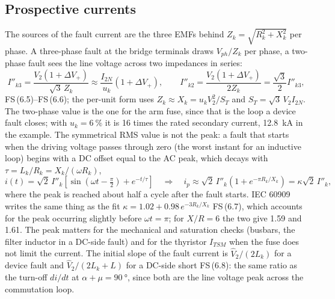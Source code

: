 \documentclass[10pt,a4paper]{scrartcl}
\newcommand{\Vll}{V_{2}}
\newcommand{\Xk}{X_{k}}
\newcommand{\Lk}{L_{k}}
\newcommand{\Rk}{R_{k}}
\newcommand{\uk}{u_{k}}
\newcommand{\ITSM}{I_{TSM}}
\newcommand{\fs}[1]{\textsf{FS}\,(#1)}
\begin{document}
\subsection{Prospective currents}
The sources of the fault current are the three EMFs behind $Z_k = \sqrt{\Rk^2+\Xk^2}$ per phase. A three-phase fault at the bridge terminals draws $V_{ph}/Z_k$ per phase, a two-phase fault sees the line voltage across two impedances in series:
\begin{equation}
I''_{k3} = \frac{\Vll(1+\Delta V_+)}{\sqrt3\,Z_k} \approx \frac{I_{2N}}{\uk}(1+\Delta V_+), \qquad
I''_{k2} = \frac{\Vll(1+\Delta V_+)}{2Z_k} = \frac{\sqrt3}{2}I''_{k3} ,
\label{eq:Ikderiv}
\end{equation}
\fs{6.5}--\fs{6.6}; the per-unit form uses $Z_k\approx\Xk = \uk\Vll^2/S_T$ and $S_T = \sqrt3\,\Vll I_{2N}$. The two-phase value is the one for the arm fuse, since that is the loop a device fault closes; with $\uk = \SI{6}{\percent}$ it is 16 times the rated secondary current, \SI{12.8}{kA} in the example. The symmetrical RMS value is not the peak: a fault that starts when the driving voltage passes through zero (the worst instant for an inductive loop) begins with a DC offset equal to the AC peak, which decays with $\tau = \Lk/\Rk = \Xk/(\omega\Rk)$,
\begin{equation}
i(t) = \sqrt2\,I''_k\left[\sin(\omega t - \tfrac{\pi}{2}) + e^{-t/\tau}\right]
\quad\Rightarrow\quad
i_p \approx \sqrt2\,I''_k\left(1 + e^{-\pi\Rk/\Xk}\right) = \kappa\sqrt2\,I''_k ,
\label{eq:kappaderiv}
\end{equation}
where the peak is reached about half a cycle after the fault starts. IEC 60909 \cite{iec60909} writes the same thing as the fit $\kappa = 1.02 + 0.98\,e^{-3\Rk/\Xk}$ \fs{6.7}, which accounts for the peak occurring slightly before $\omega t = \pi$; for $X/R = 6$ the two give 1.59 and 1.61. The peak matters for the mechanical and saturation checks (busbars, the filter inductor in a DC-side fault) and for the thyristor $\ITSM$ when the fuse does not limit the current. The initial slope of the fault current is $\hat V_2/(2\Lk)$ for a device fault and $\hat V_2/(2\Lk+L)$ for a DC-side short \fs{6.8}: the same ratio as the turn-off $di/dt$ at $\alpha+\mu = \SI{90}{\degree}$, since both are the line voltage peak across the commutation loop.
\end{document}
